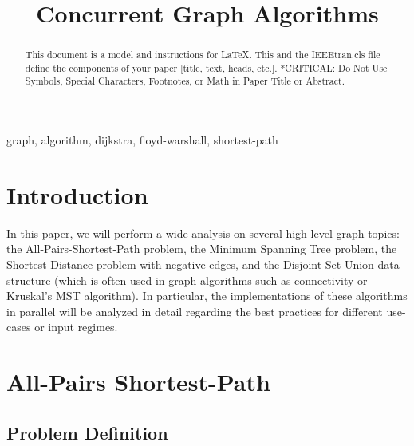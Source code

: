 \documentclass[conference]{IEEEtran}
\begin{document}
\title{Concurrent Graph Algorithms}

\author{
\and
{}
\and
{}
\and
{}}

\maketitle

\begin{abstract}
This document is a model and instructions for \LaTeX.
This and the IEEEtran.cls file define the components of your paper [title, text, heads, etc.]. *CRITICAL: Do Not Use Symbols, Special Characters, Footnotes, 
or Math in Paper Title or Abstract.
\end{abstract}

\begin{IEEEkeywords}
graph, algorithm, dijkstra, floyd-warshall, shortest-path
\end{IEEEkeywords}

\section{Introduction}
In this paper, we will perform a wide analysis on several high-level graph topics: the All-Pairs-Shortest-Path problem, the Minimum Spanning Tree problem, the Shortest-Distance problem with negative edges, and the Disjoint Set Union data structure (which is often used in graph algorithms such as connectivity or Kruskal's MST algorithm). In particular, the implementations of these algorithms in parallel will be analyzed in detail regarding the best practices for different use-cases or input regimes. 
\section{All-Pairs Shortest-Path}

\subsection{Problem Definition}
\end{document}
